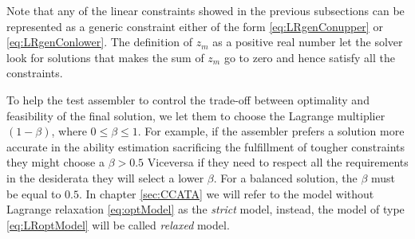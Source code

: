 Note that any of the linear constraints showed in the previous subsections can be represented as a generic constraint either of the form \eqref{eq:LRgenConupper} or \eqref{eq:LRgenConlower}.
The definition of $z_m$ as a positive real number let the solver look for solutions that makes the sum of $z_m$ go to zero and hence satisfy all the constraints. 

To help the test assembler to control the trade-off between optimality and feasibility of the final solution, we let them to choose the Lagrange multiplier $(1-\beta)$, where $0\leq\beta\leq1$. For example, if the assembler prefers a solution more accurate in the ability estimation sacrificing the fulfillment of tougher constraints they might choose a $\beta>0.5$ Viceversa if they need to respect all the requirements in the desiderata they will select a lower $\beta$. For a balanced solution, the $\beta$ must be equal to $0.5$. In chapter \ref{sec:CCATA} we will refer to the model without Lagrange relaxation \eqref{eq:optModel} as the \emph{strict} model, instead, the model of type \eqref{eq:LRoptModel} will be called \emph{relaxed} model.
